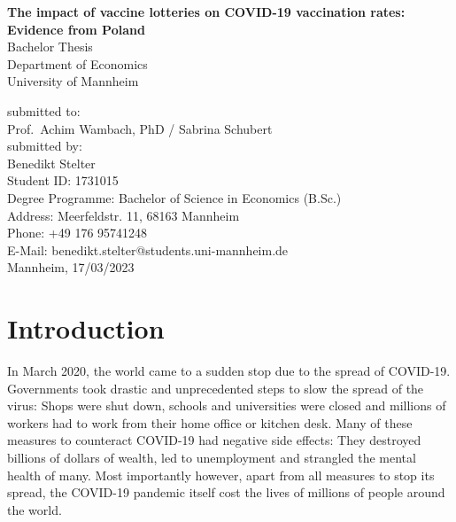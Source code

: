 \documentclass{scrbook}
\begin{document}
	
\frontmatter
\begin{titlepage}

\begin{center}

\vspace*{1,2cm}

\huge {\bfseries The impact of vaccine lotteries on COVID-19 vaccination
rates: Evidence from Poland}\\[1.8cm]

\Large {Bachelor Thesis}\\[1cm]

\large {Department of Economics}\\[0.2cm]

\large {University of Mannheim}\\[0.5cm]

\end{center}

\vfill

\noindent submitted to:\\
Prof.~Achim Wambach, PhD / Sabrina Schubert\\[1cm]
submitted by:\\
Benedikt Stelter\\[1cm]
Student ID: 1731015\\
Degree Programme: Bachelor of Science in Economics (B.Sc.)\\[1cm]
Address: Meerfeldstr. 11, 68163 Mannheim\\
Phone: +49 176 95741248\\
E-Mail: benedikt.stelter@students.uni-mannheim.de\\[1cm]
Mannheim, 17/03/2023

\setcounter{page}{0}

\end{titlepage}

  \tableofcontents


\listoffigures

\listoftables


\mainmatter

\chapter{Introduction}

In March 2020, the world came to a sudden stop due to the spread of
COVID-19. Governments took drastic and unprecedented steps to slow the
spread of the virus: Shops were shut down, schools and universities were
closed and millions of workers had to work from their home office or
kitchen desk. Many of these measures to counteract COVID-19 had negative
side effects: They destroyed billions of dollars of wealth, led to
unemployment and strangled the mental health of many. Most importantly
however, apart from all measures to stop its spread, the COVID-19
pandemic itself cost the lives of millions of people around the world.
\end{document}
